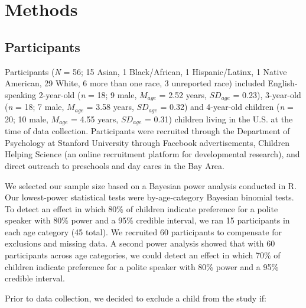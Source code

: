 \documentclass[
  english,
  man,floatsintext]{apa6}
\begin{document}
\newpage

\hypertarget{methods}{%
\section{Methods}\label{methods}}

\hypertarget{participants}{%
\subsection{Participants}\label{participants}}

Participants (\emph{N} = 56; 15 Asian, 1 Black/African, 1 Hispanic/Latinx, 1 Native American, 29 White, 6 more than one race, 3 unreported race) included English-speaking 2-year-old (\emph{n} = 18; 9 male, \(M_{age}\) = 2.52 years, \(SD_{age}\) = 0.23), 3-year-old (\emph{n} = 18; 7 male, \(M_{age}\) = 3.58 years, \(SD_{age}\) = 0.32) and 4-year-old children (\emph{n} = 20; 10 male, \(M_{age}\) = 4.55 years, \(SD_{age}\) = 0.31) children living in the U.S. at the time of data collection. Participants were recruited through the Department of Psychology at Stanford University through Facebook advertisements, Children Helping Science (an online recruitment platform for developmental research), and direct outreach to preschools and day cares in the Bay Area.

We selected our sample size based on a Bayesian power analysis conducted in R. Our lowest-power statistical tests were by-age-category Bayesian binomial tests. To detect an effect in which 80\% of children indicate preference for a polite speaker with 80\% power and a 95\% credible interval, we ran 15 participants in each age category (45 total). We recruited 60 participants to compensate for exclusions and missing data. A second power analysis showed that with 60 participants across age categories, we could detect an effect in which 70\% of children indicate preference for a polite speaker with 80\% power and a 95\% credible interval.

Prior to data collection, we decided to exclude a child from the study if:
\end{document}
